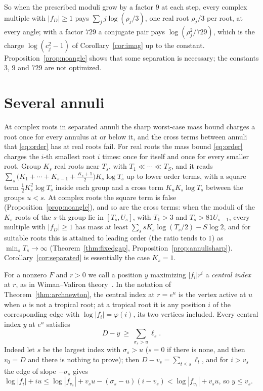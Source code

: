 \documentclass[11pt]{article}
\begin{document}
So when the prescribed moduli grow by a factor $9$ at each step, every
complex multiple with $|f_D|\ge1$ pays $\sum_jj\log(\rho_j/3)$, one real root $\rho_j/3$ per
root, at every angle; with a factor $729$ a conjugate pair pays
$\log(\rho_j^2/729)$, which is the charge $\log(c_j^2-1)$ of
Corollary~\ref{cor:imag} up to the constant.  Proposition~\ref{prop:noangle}
shows that some separation is necessary; the constants $3$, $9$ and $729$ are
not optimized.

\section{Several annuli}\label{sec:annuli}

At complex roots in separated annuli the sharp worst-case mass bound charges
a root once for every annulus at or below it, and the cross terms between
annuli that \eqref{eq:order} has at real roots fail.  For real roots the
mass bound \eqref{eq:order} charges the $i$-th smallest
root $i$ times: once for itself and once for every smaller root.  Group $K_s$
real roots near $T_s$, with $T_1\ll\cdots\ll T_S$, and it reads
$\sum_s\bigl(K_1+\cdots+K_{s-1}+\frac{K_s+1}2\bigr)K_s\log T_s$ up to lower
order terms, with a square term $\frac12K_s^2\log T_s$ inside each group and a
cross term $K_uK_s\log T_s$ between the groups $u<s$.  At complex roots the
square term is false (Proposition~\ref{prop:noangle}), and so are the cross
terms: when the moduli of the $K_s$ roots
of the $s$-th group lie in $[T_s,U_s]$, with $T_1>3$ and $T_s>81U_{s-1}$, every multiple with $|f_D|\ge1$ has mass at least
$\sum_ssK_s\log(T_s/2)-S\log2$, and for suitable roots this is
attained to leading order (the ratio tends to $1$) as $\min_sT_s\to\infty$
(Theorem~\ref{thm:fixedgap}, Proposition~\ref{prop:annulisharp}).
Corollary~\ref{cor:separated} is essentially the case $K_s=1$.

For a nonzero $F$ and $r>0$ we call a position $y$ maximizing $|f_i|r^i$ a
\emph{central index} at $r$, as in Wiman--Valiron theory~\cite{hayman}.  In the notation of Theorem~\ref{thm:archnewton},
the central index at $r=e^u$ is the vertex active at $u$ when $u$ is not a
tropical root; at a tropical root it is any position $i$ of the corresponding
edge with $\log|f_i|=\varphi(i)$, its two vertices included.  Every central
index $y$ at $e^u$ satisfies
\begin{equation}\label{eq:centralabove}
  D-y\ \ge\ \sum_{\sigma_s>u}\ell_s .
\end{equation}
Indeed let $s$ be the largest index with
$\sigma_s>u$ ($s=0$ if there is none, and then $v_0=D$ and there is nothing
to prove); then $D-v_s=\sum_{t\le s}\ell_t$, and for $i>v_s$ the edge of
slope $-\sigma_s$ gives
$\log|f_i|+iu\le\log|f_{v_s}|+v_su-(\sigma_s-u)(i-v_s)<\log|f_{v_s}|+v_su$,
so $y\le v_s$.
\end{document}
